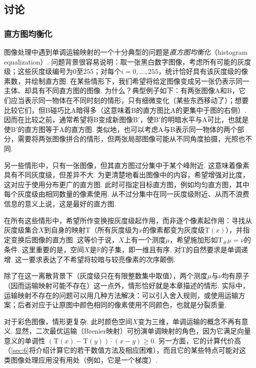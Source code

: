 \subsection{讨论}\label{sec:2.5}

\subsubsection{直方图均衡化}\label{sec:2.5.1}

图像处理中遇到单调运输映射的一个十分典型的问题是\emph{直方图均衡化}（histogram equalization）. 问题背景很容易说明：取一张黑白数字图像，考虑所有可能的灰度级；这些灰度级编号为$0$至$255$；对每个$i=0,\ldots,255$，统计恰好具有该灰度级的像素数，并绘制直方图. 在某些情形下，我们希望将给定图像变成另一张仍表示同一主体、却具有不同直方图的图像. 为什么？典型例子如下：有两张图像A和B，它们应当表示同一物体在不同时刻的情形，只有细微变化（某些东西移动了）；想要比较它们，但B碰巧比A暗得多（这意味着B的直方图比A的更集中于图的右侧）. 因而在比较之前，通常希望将B变成新图像B$'$，使B$'$的明暗水平与A可比，也就是使B$'$的直方图等于A的直方图. 类似地，也可以考虑A与B表示同一物体的两个部分，需要将两张图像拼合的情形，但两张局部图像可能从不同角度拍摄，光照也不同.

另一些情形中，只有一张图像，但其直方图过分集中于某个峰附近. 这意味着像素具有不同灰度级，但差异不大. 为更清楚地看出图像中的内容，希望增强对比度，这对应于使用分布更广的直方图. 此时可指定目标直方图，例如均匀直方图，其中每个灰度级由相同数量的像素使用. 从不过分集中在同一灰度级附近、从而不浪费信息的意义上说，这是最好的直方图.

在所有这些情形中，希望所作变换按灰度级起作用，而非逐个像素起作用：寻找从灰度级集合$X$到自身的映射$\mathrm T$（所有灰度级为$x$的像素都变为灰度级$\mathrm T(x)$），并指定变换后图像的直方图. 这等价于说，$X$上有一个测度$\mu$，希望施加形如$\mathrm T_\#\mu=\nu$的条件. 这里重要的是，空间$X$是$\mathbb R$的子集，即一维且有序. 对$\mathrm T$的自然要求是单调递增. 这一要求表达了不希望将较暗与较亮像素的次序颠倒.

除了在这一离散背景下（灰度级只在有限整数集中取值），两个测度$\mu$与$\nu$均有原子（因而运输映射可能不存在）这一点外，情形恰好就是本章描述的情形. 实际中，运输映射不存在的问题可以用几种方法解决：可以引入舍入规则，或使用运输方案；后者对应于让原图中颜色相同的像素使用不同颜色，也就是分裂质量.

对于彩色图像，情形更复杂. 此时颜色空间$X$变为三维，单调运输的概念不再有意义. 显然，二次最优运输（Brenier映射）可扮演单调映射的角色，因为它满足向量意义的单调性
$(\mathrm T(x)-\mathrm T(y))\cdot(x-y)\ge0$. 另一方面，它的计算代价高（\autoref{sec:6}将介绍计算它的若干数值方法及相应困难），而且它的某些特点可能对这类图像处理应用没有用处（例如，它是一个梯度）.

